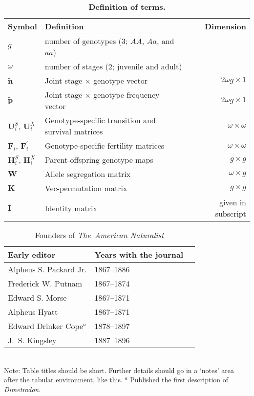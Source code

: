 \documentclass[11pt]{article}
\def\mbf#1{\mathbf{#1}}
\begin{document}
\begin{table}[htbp]
\centering
\caption{\bf Definition of terms.}
\label{tab:Terms}
\begin{tabular}{ l l r }
 \toprule
Symbol & Definition & Dimension \\
\hline
$g$      & number of genotypes ($3$; $AA$, $Aa$, and $aa$) & \\
$\omega$ & number of stages ($2$; juvenile and adult) & \\
$\tilde{\mbf{n}}$ & Joint stage $\times$ genotype vector & $2 \omega g \times 1$ \\
$\tilde{\mbf{p}}$ & Joint stage $\times$ genotype frequency vector & $2 \omega g \times 1$ \\

$\mbf{U}^{S}_{i}$, $\mbf{U}^{X}_{i}$ & Genotype-specific transition and survival matrices & $\omega \times \omega$ \\
$\mbf{F}_{i}$, $\mbf{F}^{\prime}_{i}$ & Genotype-specific fertility matrices & $\omega \times \omega$ \\
$\mbf{H}^{S}_{i}$, $\mbf{H}^{X}_{i}$ & Parent-offspring genotype maps & $g \times g$ \\
$\mbf{W}$   & Allele segregation matrix & $\omega \times g$ \\
$\mbf{K}$   & Vec-permutation matrix & $g \times g$ \\
$\mbf{I}$   & Identity matrix & given in subscript \\
\hline
\end{tabular}
\end{table}
\newpage{}




\begin{table}[h]
\caption{Founders of \textit{The~American Naturalist}}
\label{Table:Founders}
\centering
\begin{tabular}{lll}\hline
Early editor            & Years with the journal \\ \hline
Alpheus S. Packard Jr.  & 1867--1886 \\
Frederick W. Putnam     & 1867--1874 \\ 
Edward S. Morse         & 1867--1871 \\ 
Alpheus Hyatt           & 1867--1871 \\
Edward Drinker Cope$^a$ & 1878--1897 \\
J.~S. Kingsley          & 1887--1896 \\ \hline 
\end{tabular}
\bigskip{}
\\
{\footnotesize Note: Table titles should be short. Further details should go in a `notes' area after the tabular environment, like this. $^a$ Published the first description of \textit{Dimetrodon}.}
\end{table}
\end{document}
